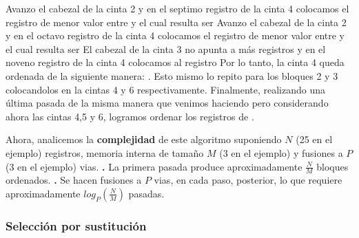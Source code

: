 \documentclass[10pt,a4paper]{article}
\begin{document}
\newline
\newline
Avanzo el cabezal de la cinta 2 y en el septimo registro de la cinta 4 colocamos el registro de menor valor entre  y  el cual resulta ser 
\newline
\newline
Avanzo el cabezal de la cinta 2 y en el octavo registro de la cinta 4 colocamos el registro de menor valor entre  y  el cual resulta ser 
\newline
\newline
El cabezal de la cinta 3 no apunta a más registros y en el noveno registro de la cinta 4 colocamos al registro 
\newline
\newline
Por lo tanto, la cinta 4 queda ordenada de la siguiente manera: .
\newline
\newline
Esto mismo lo repito para los bloques 2 y 3 colocandolos en la cintas 4 y 6 respectivamente.
\newline
\newline
Finalmente, realizando una última pasada de la misma manera que venimos haciendo pero considerando ahora las cintas 4,5 y 6, logramos ordenar los registros de . 
\newpage

Ahora, analicemos la \textbf{complejidad} de este algoritmo suponiendo $N$ (25 en el ejemplo) registros, memoria interna de tamaño $M$ (3 en el ejemplo) y fusiones a $P$ (3 en el ejemplo) vias.
\newline
\newline
\textbf{.} La primera pasada produce aproximadamente $\displaystyle \frac{N}{M}$ bloques ordenados.
\newline
\newline
\textbf{.} Se hacen fusiones a $P$ vias, en cada paso, posterior, lo que requiere aproximadamente $log_{P}(\displaystyle \frac{N}{M})$ pasadas.

\subsubsection{Selección por sustitución}
\end{document}
